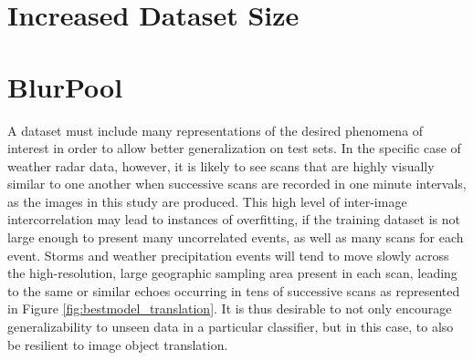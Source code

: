 \section{Increased Dataset Size}
\label{sec:bestmodel_dataset}

\section{BlurPool}
\label{sec:bestmodel_blurpool}

A dataset must include many representations of the desired phenomena of interest in order to allow better generalization on test sets.
In the specific case of weather radar data, however, it is likely to see scans that are highly visually similar to one another when successive scans are recorded in one minute intervals, as the images in this study are produced.
This high level of inter-image intercorrelation may lead to instances of overfitting, if the training dataset is not large enough to present many uncorrelated events, as well as many scans for each event.
Storms and weather precipitation events will tend to move slowly across the high-resolution, large geographic sampling area present in each scan, leading to the same or similar echoes occurring in tens of successive scans as represented in Figure \ref{fig:bestmodel_translation}.
It is thus desirable to not only encourage generalizability to unseen data in a particular classifier, but in this case, to also be resilient to image object translation.

